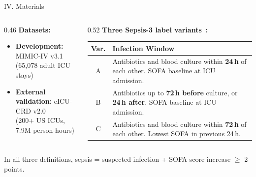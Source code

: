 \documentclass[aspectratio=169,10pt]{beamer}
\newcommand{\tablestyle}{%
  \renewcommand{\arraystretch}{1.2}%
  \small%
}
\begin{document}
\begin{frame}{IV. Materials}
\begin{columns}[T]
\begin{column}{0.46\textwidth}
\textbf{Datasets:}
\begin{itemize}
  \item \textbf{Development:} MIMIC-IV v3.1~\cite{johnson2023mimiciv}\\(65,078 adult ICU stays)
  \item \textbf{External validation:} eICU-CRD v2.0~\cite{pollard2018eicu}\\(200+ US ICUs, 7.9M person-hours)
\end{itemize}
\end{column}
\begin{column}{0.52\textwidth}
\textbf{Three Sepsis-3 label variants~\cite{singer2016sepsis3}:}
\vspace{2pt}

\tablestyle
\begin{tabular}{cp{6.5cm}}
\toprule
\textbf{Var.} & \textbf{Infection Window} \\
\midrule
A & Antibiotics and blood culture within \textbf{24\,h} of each other. SOFA baseline at ICU admission. \\
B & Antibiotics up to \textbf{72\,h before} culture, or \textbf{24\,h after}. SOFA baseline at ICU admission. \\
C & Antibiotics and blood culture within \textbf{72\,h} of each other. Lowest SOFA in previous 24\,h. \\
\bottomrule
\end{tabular}
\end{column}
\end{columns}

\vspace{6pt}
\begin{alertblock}{}
  \centering In all three definitions, sepsis = suspected infection + SOFA score increase $\geq$ 2 points.
\end{alertblock}
\end{frame}
\end{document}

